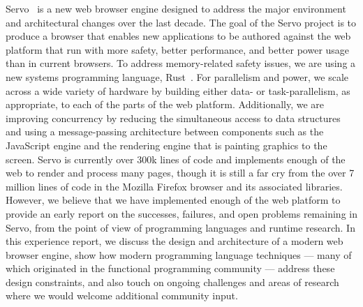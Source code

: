 Servo~\cite{SERVO} is a new web browser engine designed to address the major environment and 
architectural changes over the last decade.
The goal of the Servo project is to produce a browser that enables new applications to be authored
against the web platform that run with more safety, better performance, and better power usage
than in current browsers.
To address memory-related safety issues, we are using a new systems programming language,
Rust~\cite{RUST}.
For parallelism and power, we scale across a wide variety of hardware by building either data-
or task-parallelism, as appropriate, to each of the parts of the web platform.
Additionally, we are improving concurrency by reducing the simultaneous access to data
structures and using a message-passing architecture between components such as the
JavaScript engine and the rendering engine that is painting graphics to the screen.
Servo is currently over 300k lines of code and implements enough of the web to render and
process many pages, though it is still a far cry from the over 7 million lines of code in
the Mozilla Firefox browser and its associated libraries.
However, we believe that we have implemented enough of the web platform to provide an
early report on the successes, failures, and open problems remaining in Servo, from the
point of view of programming languages and runtime research.
In this experience report, we discuss the design and architecture of a modern web 
browser engine, show how modern programming language techniques --- many of which
originated in the functional programming community --- address these design 
constraints, and also touch on ongoing challenges and areas of research where we
would welcome additional community input.

